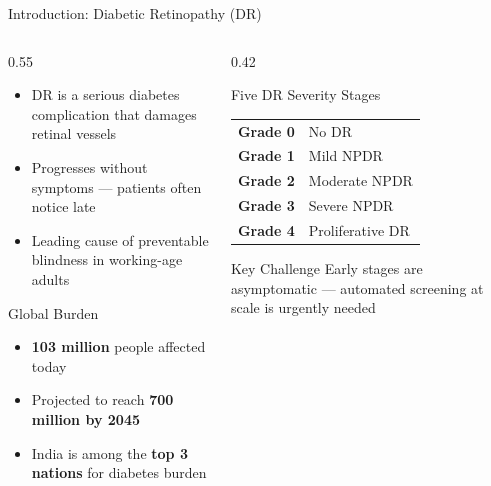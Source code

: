 \documentclass[aspectratio=169, 11pt]{beamer}
\begin{document}
\begin{frame}{Introduction: Diabetic Retinopathy (DR)}
  \begin{columns}[T]
    \begin{column}{0.55\textwidth}
      \begin{itemize}\small
        \item DR is a serious diabetes complication that damages retinal vessels
        \item Progresses without symptoms --- patients often notice late
        \item Leading cause of \alert{preventable blindness} in working-age adults
      \end{itemize}
      \vspace{4pt}
      \begin{block}{Global Burden}
        \small
        \begin{itemize}
          \item \textbf{103 million} people affected today
          \item Projected to reach \textbf{700 million by 2045}
          \item India is among the \textbf{top 3 nations} for diabetes burden
        \end{itemize}
      \end{block}
    \end{column}
    \begin{column}{0.42\textwidth}
      \begin{block}{Five DR Severity Stages}
        \small\renewcommand{\arraystretch}{1.2}
        \begin{tabular}{cl}
          \textbf{Grade 0} & No DR \\
          \textbf{Grade 1} & Mild NPDR \\
          \textbf{Grade 2} & Moderate NPDR \\
          \textbf{Grade 3} & Severe NPDR \\
          \textbf{Grade 4} & Proliferative DR \\
        \end{tabular}
      \end{block}
      \begin{alertblock}{Key Challenge}\small
        Early stages are asymptomatic --- automated screening at scale is urgently needed
      \end{alertblock}
    \end{column}
  \end{columns}
\end{frame}
\end{document}
